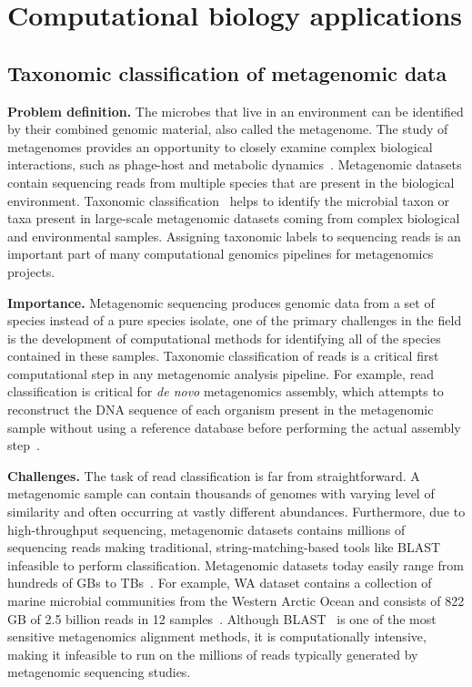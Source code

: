 
\section{Computational biology applications}


\subsection{Taxonomic classification of metagenomic data}

\textbf{Problem definition.}
The microbes that live in an environment can be identified by their combined genomic material, also called the metagenome.
The study of metagenomes provides an opportunity to closely examine complex biological interactions, such as phage-host and metabolic dynamics~\cite{national2007new}.
Metagenomic datasets contain sequencing reads from multiple species that are present in the biological environment.
%
Taxonomic classification~\cite{wood2014kraken} helps to identify the microbial taxon or taxa present in large-scale  metagenomic datasets coming from complex biological and environmental samples. Assigning taxonomic labels to sequencing reads is an important part of many computational genomics pipelines for metagenomics projects.

\noindent
\textbf{Importance.}
Metagenomic sequencing produces genomic data from a set of species instead of a pure species isolate, one of the primary challenges in the field is the development of computational methods for identifying all of the species contained in these samples.
%
Taxonomic classification of reads is a critical first computational step in any metagenomic analysis pipeline.
For example, read classification is critical for \emph{de novo} metagenomics assembly, which attempts to reconstruct the DNA sequence of each organism present in the metagenomic sample without using a reference database before performing the actual assembly step~\cite{venter2004environmental,brady2009phymm,brady2011phymmbl,rosen2008metagenome,segata2012metagenomic}.

\noindent
\textbf{Challenges.}
The task of read classification is far from straightforward.
A metagenomic sample can contain thousands of genomes with varying level of similarity and often occurring at vastly different abundances. Furthermore, due to high-throughput sequencing, metagenomic datasets contains millions of sequencing reads making traditional, string-matching-based tools like BLAST infeasible to perform classification. Metagenomic datasets today easily range from hundreds of GBs to TBs~\cite{hofmeyr2020terabase}. For example, WA dataset contains a collection of marine microbial communities from the Western Arctic Ocean and consists of 822 GB of 2.5 billion reads in 12 samples~\cite{hofmeyr2020terabase}.
%
Although BLAST~\cite{altschul1990basic} is one of the most sensitive metagenomics alignment methods, it is computationally intensive, making it infeasible to run on the millions of reads typically generated by metagenomic sequencing studies.

